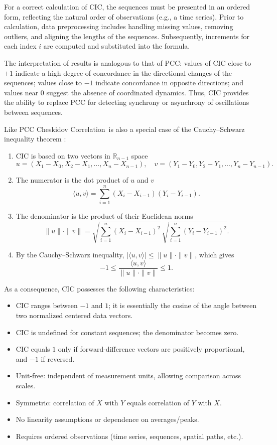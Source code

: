 \documentclass[aos]{imsart}
\newcommand{\cic}{\text{CIC}}
\newcommand{\cicFull}{\textnormal{Cheskidov Correlation}}
\newcommand{\pcc}{\text{PCC}}
\begin{document}
For a correct calculation of $\cic$, the sequences must be presented in an ordered form, reflecting the natural order of observations (e.g., a time series). Prior to calculation, data preprocessing includes handling missing values, removing outliers, and aligning the lengths of the sequences. Subsequently, increments for each index $i$ are computed and substituted into the formula.

The interpretation of results is analogous to that of PCC: values of $\cic$ close to $+1$ indicate a high degree of concordance in the directional changes of the sequences; values close to $-1$ indicate concordance in opposite directions; and values near $0$ suggest the absence of coordinated dynamics. Thus, $\cic$ provides the ability to replace PCC for detecting synchrony or asynchrony of oscillations between sequences.

Like $\pcc$ \cicFull\ is also a special case of the Cauchy\allowbreak--\allowbreak Schwarz inequality theorem \cite{r3}:
\begin{enumerate}
\item $\cic$ is based on two vectors in $\mathbb{R}_{n-1}$ space
\[
u = (X_1-X_0, X_2-X_1, \dots, X_n-X_{n-1}), \quad
v = (Y_1-Y_0, Y_2-Y_1, \dots, Y_n-Y_{n-1}).
\]
\item The numerator is the dot product of $u$ and $v$
\[
\langle u,v \rangle = \sum_{i=1}^n (X_i - X_{i-1})(Y_i - Y_{i-1}).
\]
\item The denominator is the product of their Euclidean norms
\[
\|u\| \cdot \|v\| = \sqrt{\sum_{i=1}^n (X_i - X_{i-1})^2} \, \sqrt{\sum_{i=1}^n (Y_i - Y_{i-1})^2}.
\]
\item By the Cauchy–Schwarz inequality, $|\langle u,v \rangle| \le \|u\|\cdot \|v\|$, which gives
\[
-1 \le \frac{\langle u,v \rangle}{\|u\|\cdot \|v\|} \le 1.
\]
\end{enumerate}

As a consequence, $\cic$ possesses the following characteristics:
\begin{itemize}
\item $\cic$ ranges between $-1$ and $1$; it is essentially the cosine of the angle between two normalized centered data vectors.
\item $\cic$ is undefined for constant sequences; the denominator becomes zero.
\item $\cic$ equals $1$ only if forward-difference vectors are positively proportional, and $-1$ if reversed.
\item Unit-free: independent of measurement units, allowing comparison across scales.
\item Symmetric: correlation of $X$ with $Y$ equals correlation of $Y$ with $X$.
\item No linearity assumptions or dependence on averages/peaks.
\item Requires ordered observations (time series, sequences, spatial paths, etc.).
\end{itemize}
\end{document}
